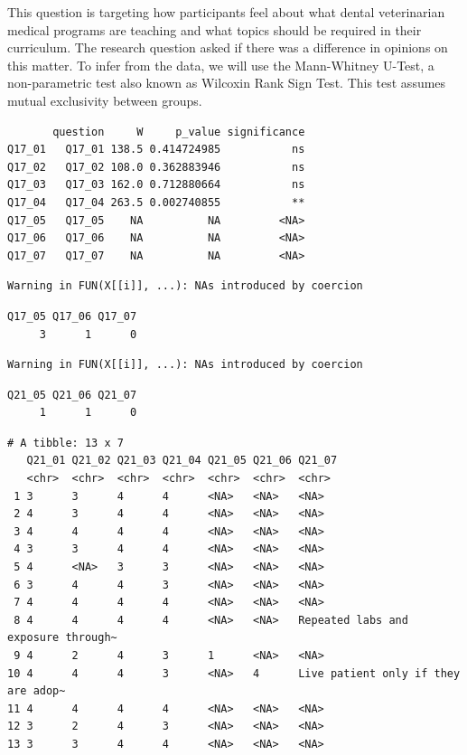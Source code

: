\documentclass[
  11pt,
  letterpaper,
  DIV=11,
  numbers=noendperiod]{scrartcl}
\begin{document}
This question is targeting how participants feel about what dental
veterinarian medical programs are teaching and what topics should be
required in their curriculum. The research question asked if there was a
difference in opinions on this matter. To infer from the data, we will
use the Mann-Whitney U-Test, a non-parametric test also known as
Wilcoxin Rank Sign Test. This test assumes mutual exclusivity between
groups.

\begin{verbatim}
       question     W     p_value significance
Q17_01   Q17_01 138.5 0.414724985           ns
Q17_02   Q17_02 108.0 0.362883946           ns
Q17_03   Q17_03 162.0 0.712880664           ns
Q17_04   Q17_04 263.5 0.002740855           **
Q17_05   Q17_05    NA          NA         <NA>
Q17_06   Q17_06    NA          NA         <NA>
Q17_07   Q17_07    NA          NA         <NA>
\end{verbatim}

\begin{verbatim}
Warning in FUN(X[[i]], ...): NAs introduced by coercion
\end{verbatim}

\begin{verbatim}
Q17_05 Q17_06 Q17_07 
     3      1      0 
\end{verbatim}

\begin{verbatim}
Warning in FUN(X[[i]], ...): NAs introduced by coercion
\end{verbatim}

\begin{verbatim}
Q21_05 Q21_06 Q21_07 
     1      1      0 
\end{verbatim}

\begin{verbatim}
# A tibble: 13 x 7
   Q21_01 Q21_02 Q21_03 Q21_04 Q21_05 Q21_06 Q21_07                             
   <chr>  <chr>  <chr>  <chr>  <chr>  <chr>  <chr>                              
 1 3      3      4      4      <NA>   <NA>   <NA>                               
 2 4      3      4      4      <NA>   <NA>   <NA>                               
 3 4      4      4      4      <NA>   <NA>   <NA>                               
 4 3      3      4      4      <NA>   <NA>   <NA>                               
 5 4      <NA>   3      3      <NA>   <NA>   <NA>                               
 6 3      4      4      3      <NA>   <NA>   <NA>                               
 7 4      4      4      4      <NA>   <NA>   <NA>                               
 8 4      4      4      4      <NA>   <NA>   Repeated labs and exposure through~
 9 4      2      4      3      1      <NA>   <NA>                               
10 4      4      4      3      <NA>   4      Live patient only if they are adop~
11 4      4      4      4      <NA>   <NA>   <NA>                               
12 3      2      4      3      <NA>   <NA>   <NA>                               
13 3      3      4      4      <NA>   <NA>   <NA>                               
\end{verbatim}
\end{document}
